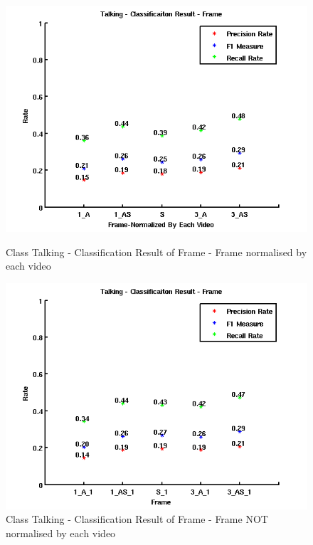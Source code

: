 \begin{figure}[ht]
\centering
\begin{minipage}{.5\textwidth}
  \centering
  \captionsetup{justification=centering,margin=1cm}
  \includegraphics[width=\linewidth]{imgs/Result_Talking_Frame.png}
  \caption{Class Talking - Classification Result of Frame - Frame normalised by each video}
  \label{fig:RTF}
\end{minipage}%
\begin{minipage}{.5\textwidth}
  \centering
  \captionsetup{justification=centering,margin=1cm}
  \includegraphics[width=\linewidth]{imgs/Result_Talking_Frame_1.png}
  \caption{Class Talking - Classification Result of Frame - Frame NOT normalised by each video}
  \label{fig:RTF1}
\end{minipage}
\end{figure}
